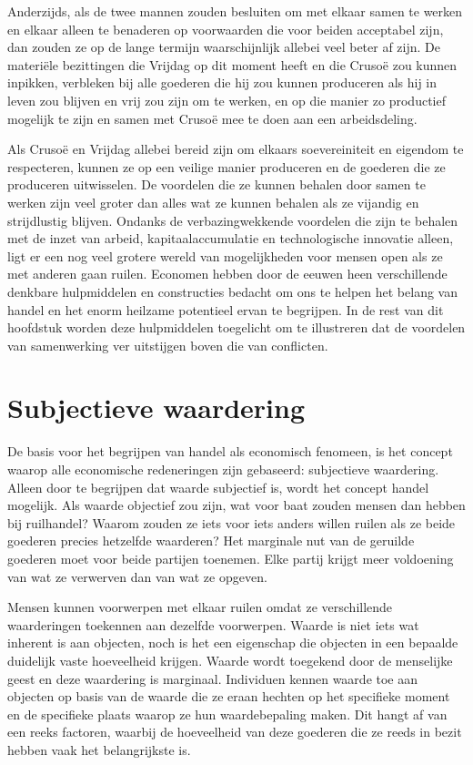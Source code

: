 Anderzijds, als de twee mannen zouden besluiten om met elkaar samen te werken en elkaar alleen te benaderen op voorwaarden die voor beiden acceptabel zijn, dan zouden ze op de lange termijn waarschijnlijk allebei veel beter af zijn. De materiële bezittingen die Vrijdag op dit moment heeft en die Crusoë zou kunnen inpikken, verbleken bij alle goederen die hij zou kunnen produceren als hij in leven zou blijven en vrij zou zijn om te werken, en op die manier zo productief mogelijk te zijn en samen met Crusoë mee te doen aan een arbeidsdeling.

Als Crusoë en Vrijdag allebei bereid zijn om elkaars soevereiniteit en eigendom te respecteren, kunnen ze op een veilige manier produceren en de goederen die ze produceren uitwisselen. De voordelen die ze kunnen behalen door samen te werken zijn veel groter dan alles wat ze kunnen behalen als ze vijandig en strijdlustig blijven. Ondanks de verbazingwekkende voordelen die zijn te behalen met de inzet van arbeid, kapitaalaccumulatie en technologische innovatie alleen, ligt er een nog veel grotere wereld van mogelijkheden voor mensen open als ze met anderen gaan ruilen. Economen hebben door de eeuwen heen verschillende denkbare hulpmiddelen en constructies bedacht om ons te helpen het belang van handel en het enorm heilzame potentieel ervan te begrijpen. In de rest van dit hoofdstuk worden deze hulpmiddelen toegelicht om te illustreren dat de voordelen van samenwerking ver uitstijgen boven die van conflicten.

\hypertarget{subjectieve-waardering}{%
\section{Subjectieve waardering}\label{subjectieve-waardering}}

De basis voor het begrijpen van handel als economisch fenomeen, is het concept waarop alle economische redeneringen zijn gebaseerd: subjectieve waardering. Alleen door te begrijpen dat waarde subjectief is, wordt het concept handel mogelijk. Als waarde objectief zou zijn, wat voor baat zouden mensen dan hebben bij ruilhandel? Waarom zouden ze iets voor iets anders willen ruilen als ze beide goederen precies hetzelfde waarderen? Het marginale nut van de geruilde goederen moet voor beide partijen toenemen. Elke partij krijgt meer voldoening van wat ze verwerven dan van wat ze opgeven.

Mensen kunnen voorwerpen met elkaar ruilen omdat ze verschillende waarderingen toekennen aan dezelfde voorwerpen. Waarde is niet iets wat inherent is aan objecten, noch is het een eigenschap die objecten in een bepaalde duidelijk vaste hoeveelheid krijgen. Waarde wordt toegekend door de menselijke geest en deze waardering is marginaal. Individuen kennen waarde toe aan objecten op basis van de waarde die ze eraan hechten op het specifieke moment en de specifieke plaats waarop ze hun waardebepaling maken. Dit hangt af van een reeks factoren, waarbij de hoeveelheid van deze goederen die ze reeds in bezit hebben vaak het belangrijkste is.


